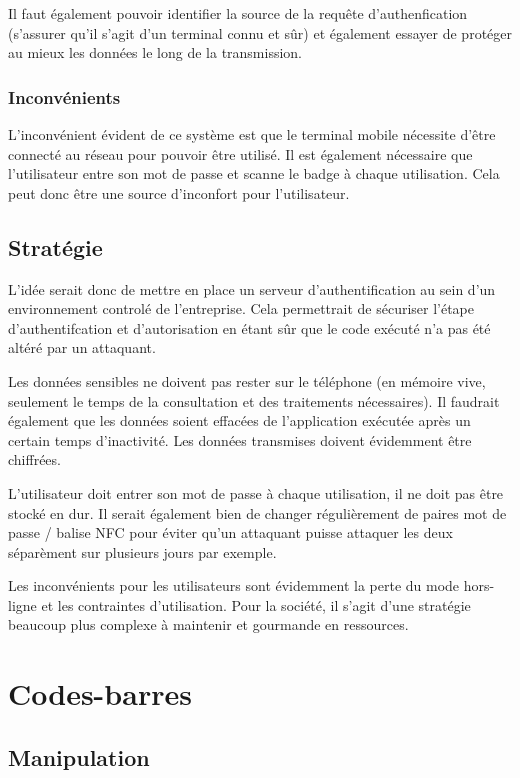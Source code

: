 \documentclass[francais,12pt]{article}
\begin{document}
	 Il faut également pouvoir identifier la source de la requête d'authenfication (s'assurer qu'il s'agit d'un terminal connu et sûr) et également essayer de protéger au mieux les données le long de la transmission.  
	 
	 \subsubsection*{Inconvénients}
	 L'inconvénient évident de ce système est que le terminal mobile nécessite d'être connecté au réseau pour pouvoir être utilisé. Il est également nécessaire que l'utilisateur entre son mot de passe et scanne le badge à chaque utilisation. Cela peut donc être une source d'inconfort pour l'utilisateur. 
	 
	 \subsection*{Stratégie}
	 L'idée serait donc de mettre en place un serveur d'authentification au sein d'un environnement controlé de l'entreprise. Cela permettrait de sécuriser l'étape d'authentifcation et d'autorisation en étant sûr que le code exécuté n'a pas été altéré par un attaquant. 
	 
	 Les données sensibles ne doivent pas rester sur le téléphone (en mémoire vive, seulement le temps de la consultation et des traitements nécessaires). Il faudrait également que les données soient effacées de l'application exécutée après un certain temps d'inactivité. Les données transmises doivent évidemment être chiffrées.
	 
	 L'utilisateur doit entrer son mot de passe à chaque utilisation, il ne doit pas être stocké en dur. 
	 Il serait également bien de changer régulièrement de paires mot de passe / balise NFC pour éviter qu'un attaquant puisse attaquer les deux séparèment sur plusieurs jours par exemple. 
	 
	 Les inconvénients pour les utilisateurs sont évidemment la perte du mode hors-ligne et les contraintes d'utilisation. Pour la société, il s'agit d'une stratégie beaucoup plus complexe à maintenir et gourmande en ressources.
	 
	\section*{Codes-barres}
	\subsection*{Manipulation}
\end{document}
